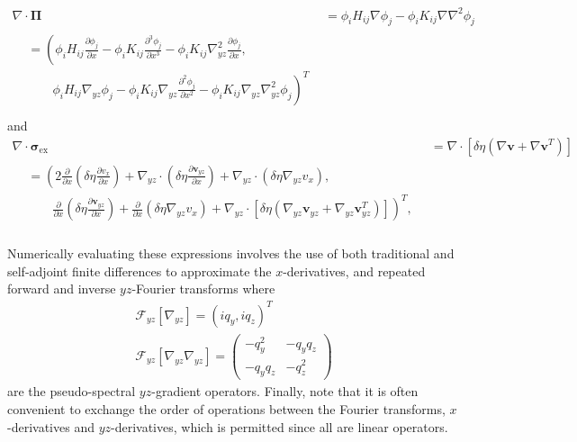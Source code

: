 \documentclass[journal=mamobx,manuscript=suppinfo]{achemso}
\newcommand{\ex}{\mathrm{ex}}
\begin{document}
\begin{align}
  \nabla \cdot \bm{\Pi} & = \phi_{i} H_{ij} \nabla \phi_{j} - \phi_{i} K_{ij} \nabla \nabla^{2} \phi_{j} \\
  \begin{split}
    & = \left ( \phi_{i} H_{ij} \frac{\partial \phi_{j} }{\partial x} 
                - \phi_{i} K_{ij} \frac{\partial^{3} \phi_{j} }{\partial x^{3}}
                - \phi_{i} K_{ij} \nabla_{yz}^{2} \frac{\partial \phi_{j} }{\partial x},  \right . \\
    & \qquad \left . \phi_{i} H_{ij} \nabla_{yz} \phi_{j} 
                - \phi_{i} K_{ij} \nabla_{yz} \frac{\partial^{2} \phi_{j}}{\partial x^{2}}
                - \phi_{i} K_{ij} \nabla_{yz} \nabla_{yz}^{2} \phi_{j} \right )^{T} \\
  \end{split}
\end{align}
and
\begin{align}
  \nabla \cdot \bm{\sigma}_{\ex} & = \nabla \cdot [\delta \eta (\nabla \bm{v} + \nabla \bm{v}^{T}) ] \\
    \begin{split}
    & = \left ( 2 \frac{\partial}{\partial x} ( \delta \eta \frac{\partial v_{x}}{\partial x} ) \right .
      + \nabla_{yz} \cdot ( \delta \eta \frac{\partial \bm{v}_{yz}}{\partial x} )
      + \nabla_{yz} \cdot ( \delta \eta \nabla_{yz} {v}_{x} ), \\
    & \qquad \left . \frac{\partial}{\partial x} ( \delta \eta \frac{\partial \bm{v}_{yz}}{\partial x} )
      + \frac{\partial}{\partial x} \left ( \delta \eta \nabla_{yz} {v}_{x} \right )
      + \nabla_{yz} \cdot [ \delta \eta (\nabla_{yz} \bm{v}_{yz} + \nabla_{yz} \bm{v}_{yz}^{T} ) ] \right )^{T} \textrm{, } \\ 
    \end{split}
\end{align}

Numerically evaluating these expressions involves the use of both traditional and self-adjoint finite differences to approximate the $x$-derivatives, and repeated forward and inverse $yz$-Fourier transforms where 
\begin{gather}
  \mathcal{F}_{yz}[\nabla_{yz}] = \left ( i q_y, i q_z \right )^{T} \\
  \mathcal{F}_{yz}[\nabla_{yz}\nabla_{yz}] = \begin{pmatrix}
    - q_y^2 & -q_y q_z \\
    -q_y q_z & -q_z^{2}
  \end{pmatrix}
\end{gather}
are the pseudo-spectral $yz$-gradient operators.
Finally, note that it is often convenient to exchange the order of operations between the Fourier transforms, $x$-derivatives and $yz$-derivatives, which is permitted since all are linear operators.
\end{document}
